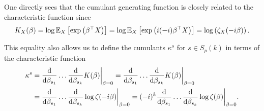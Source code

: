 One directly sees that the cumulant generating function is closely related to the characteristic function since
\begin{equation*}
    K_X(\beta) 
    = \log \mathbb{E}_{X}\left[\exp\left(\beta^\top X\right)\right] 
    = \log \mathbb{E}_{X}\left[\exp\left(i (-i)\beta^\top X\right)\right]
    = \log\left(\zeta_X(-i\beta)\right).
\end{equation*}

This equality also allows us to define the cumulants $\kappa^s$ for $s \in S_p(k)$ in terms of the characteristic function
\begin{align*}
    \kappa^s
    &= \frac{\text{d}}{\text{d} \beta_{s_1}}\ldots\frac{\text{d}}{\text{d} \beta_{s_k}} K(\beta) \bigg|_{\beta=0}
    = \frac{\text{d}}{\text{d} \beta_{s_1}}\ldots\frac{\text{d}}{\text{d} \beta_{s_k}} K(\beta) \bigg|_{\beta=0}\\
    &= \frac{\text{d}}{\text{d} \beta_{s_1}}\ldots\frac{\text{d}}{\text{d} \beta_{s_k}} \log \zeta(-i\beta) \bigg|_{\beta=0}
    = (-i)^{k} \frac{\text{d}}{\text{d} \beta_{s_1}}\ldots\frac{\text{d}}{\text{d} \beta_{s_k}} \log \zeta(\beta) \bigg|_{\beta=0}.
\end{align*}

